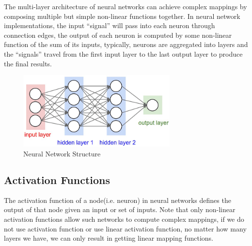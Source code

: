 The multi-layer architecture of neural networks can achieve complex mappings by composing 
multiple but simple non-linear functions together.
In neural network implementations, the input “signal” will pass into each neuron through
connection edges, the output of each neuron is computed by some non-linear function of 
the sum of its inputs, typically, neurons are aggregated into layers and the “signals”
travel from the first input layer to the last output layer to produce the final results.
\begin{figure}[H]
    \begin{center}
    \includegraphics[width=8cm]{figures/nn-structure}
    \end{center}
    \caption{Neural Network Structure}
    \label{fig:neural-network-structure}
\end{figure}

\subsection{Activation Functions}
The activation function of a node(i.e. neuron) in neural networks defines the output of that node 
given an input or set of inputs. Note that only non-linear activation functions allow such networks 
to compute complex mappings, if we do not use activation function or use linear activation function,
no matter how many layers we have, we can only result in getting linear mapping functions.


